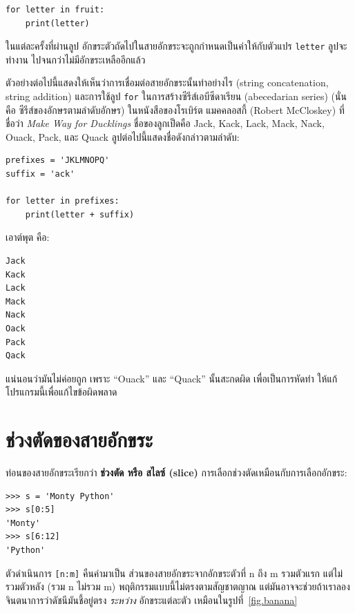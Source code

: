 \begin{verbatim}
for letter in fruit:
    print(letter)
\end{verbatim}
%
ในแต่ละครั้งที่ผ่านลูป อักขระตัวถัดไปในสายอักขระจะถูกกำหนดเป็นค่าให้กับตัวแปร {\tt letter} ลูปจะทำงาน
ไปจนกว่าไม่มีอักขระเหลืออีกแล้ว

ตัวอย่างต่อไปนี้แสดงให้เห็นว่าการเชื่อมต่อสายอักขระนั้นทำอย่างไร (string concatenation, string addition)
และการใช้ลูป {\tt for} ในการสร้างซีรีส์เอบีซีดาเรียน  (abecedarian series) (นั่นคือ 
ซีรีส์ของอักษรตามลำดับอักษร) ในหนังสือของโรเบิร์ต แมคคลอสกี้ (Robert McCloskey) ที่ชื่อว่า {\em Make
Way for Ducklings} ชื่อของลูกเป็ดคือ Jack, Kack, Lack, Mack, Nack, Ouack, Pack, และ 
Quack ลูปต่อไปนี้แสดงชื่อดังกล่าวตามลำดับ:  

\begin{verbatim}
prefixes = 'JKLMNOPQ'
suffix = 'ack'

for letter in prefixes:
    print(letter + suffix)
\end{verbatim}
%
เอาต์พุต คือ:

\begin{verbatim}
Jack
Kack
Lack
Mack
Nack
Oack
Pack
Qack
\end{verbatim}
%
แน่นอนว่ามันไม่ค่อยถูก เพราะ ``Ouack'' และ ``Quack'' นั้นสะกดผิด เพื่อเป็นการหัดทำ
ให้แก้โปรแกรมนี้เพื่อแก้ไขข้อผิดพลาด


\section{ช่วงตัดของสายอักขระ } %
\label{slice}
  
 
  
 

ท่อนของสายอักขระเรียกว่า {\bf ช่วงตัด หรือ สไลซ์ (slice)} การเลือกช่วงตัดเหมือนกับการเลือกอักขระ:

\begin{verbatim}
>>> s = 'Monty Python'
>>> s[0:5]
'Monty'
>>> s[6:12]
'Python'
\end{verbatim}
%
ตัวดำเนินการ {\tt [n:m]} คืนค่ามาเป็น ส่วนของสายอักขระจากอักขระตัวที่ n ถึง m 
รวมตัวแรก แต่ไม่รวมตัวหลัง (รวม n ไม่รวม m) พฤติกรรมแบบนี้ไม่ตรงตามสัญชาตญาณ 
แต่มันอาจจะช่วยถ้าเราลองจินตนาการว่าดัชนีมันชี้อยู่ตรง {\em ระหว่าง} อักขระแต่ละตัว เหมือนในรูปที่~\ref{fig.banana}

